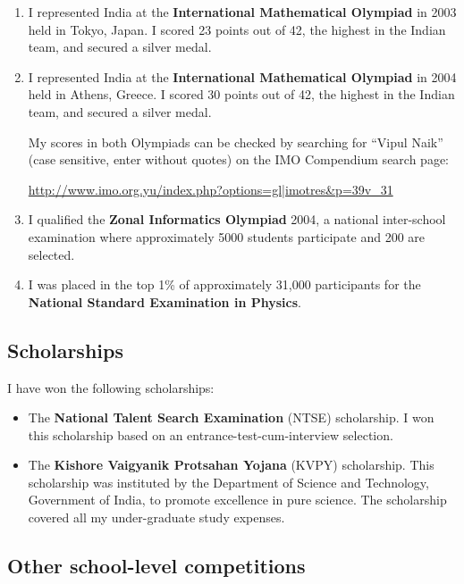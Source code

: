 \documentclass[12pt,a4paper,oneside]{amsart}
\begin{document}
\begin{enumerate}

\item I represented India at the {\bf International Mathematical
  Olympiad} in 2003 held in Tokyo, Japan. I scored 23 points out of 42,
  the highest in the Indian team, and secured a silver medal.

\item I represented India at the {\bf International Mathematical
    Olympiad} in 2004 held in Athens, Greece. I scored 30 points out
  of 42, the highest in the Indian team, and secured a silver medal.

  My scores in both Olympiads can be checked by searching for ``Vipul Naik''
  (case sensitive, enter without quotes) on the IMO Compendium search page:

  \url{http://www.imo.org.yu/index.php?options=gl|imotres&p=39v_31}

\item I qualified the {\bf Zonal Informatics Olympiad} 2004, a
  national inter-school examination where approximately 5000 students
  participate and 200 are selected.

\item I was placed in the top 1\% of approximately
  31,000 participants for the {\bf National Standard Examination in Physics}.
\end{enumerate}

\subsection{Scholarships}

I have won the following scholarships:

\begin{itemize}

\item The {\bf National Talent Search Examination} (NTSE) scholarship.
  I won this scholarship based on an entrance-test-cum-interview selection.

\item The {\bf Kishore Vaigyanik Protsahan Yojana} (KVPY) scholarship.
  This scholarship was instituted by the Department of Science and
  Technology, Government of India, to promote excellence in pure
  science. The scholarship covered all my under-graduate study
  expenses.
\end{itemize}

\subsection{Other school-level competitions}
\end{document}
